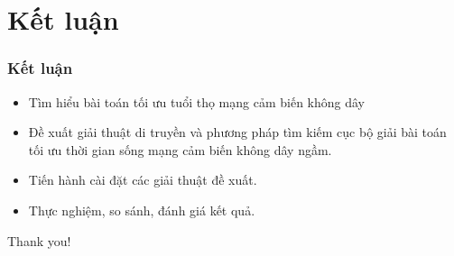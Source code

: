 \section{Kết luận}

\begin{frame}
    \frametitle{Kết luận}

    \begin{itemize}
        \item Tìm hiểu bài toán tối ưu tuổi thọ mạng cảm biến không dây 
        \item Đề xuất giải thuật di truyền và phương pháp tìm kiếm cục bộ giải bài toán tối ưu thời gian sống mạng cảm biến không dây ngầm.
        \item Tiến hành cài đặt các giải thuật đề xuất.
        \item Thực nghiệm, so sánh, đánh giá kết quả.
    \end{itemize}
\end{frame}

\begin{frame}
    \Huge{\centerline{Thank you!}}
\end{frame}